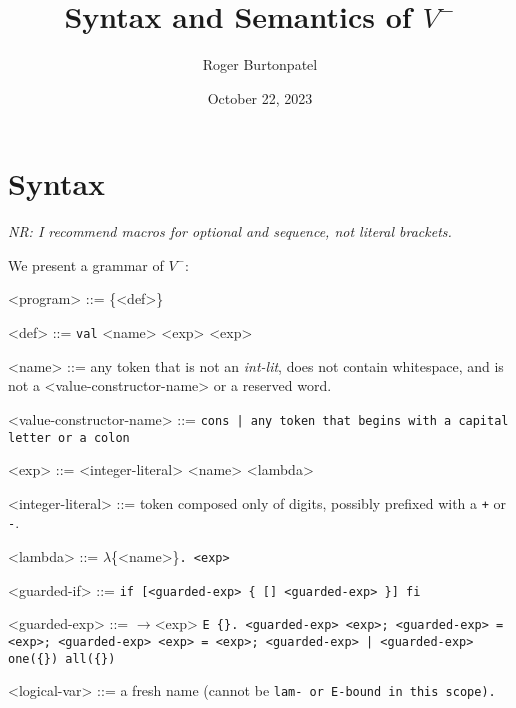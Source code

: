 \documentclass[]{article}
\title{Syntax and Semantics of $V^{-}$}
\author{Roger Burtonpatel}
\date{October 22, 2023}
\newcommand\nr[1]{\leavevmode\emph{NR: #1}}
\begin{document}
\maketitle

\section{Syntax}

\nr{I recommend macros for optional and sequence, not literal brackets.}

We present a grammar of $V^{-}$: 

\bigskip



\begin{grammar}
    <program> ::= \{<def>\}
    
    <def> ::= \texttt{val} <name> <exp>
        \alt <exp>
    
    <name> ::= any token that is not an \textit{int-lit}, does not contain 
    whitespace,
    and is not a <value-constructor-name> or a reserved word.

    <value-constructor-name> ::= \tt{cons} | any token that begins
    with a capital letter or a colon

    <exp> ::= <integer-literal>
        \alt <name>
        \alt <lambda>

    <integer-literal> ::= token composed only of digits, possibly prefixed with a \texttt{+} or \texttt{-}.

    <lambda> ::= $\lambda$\{<name>\}\tt{.} <exp>

    <guarded-if> ::= \tt{if}  [<guarded-exp> \{ [] <guarded-exp> \}] \tt{fi}


    <guarded-exp> ::= $\boldsymbol{\rightarrow}$<exp>
    \alt  \tt{E} \{<logical-var>\}\tt{.} <guarded-exp>
    \alt  <exp>\tt{;} <guarded-exp>
     \tt{=} <exp>\tt{;} <guarded-exp>
    \alt   <exp> \tt{=} <exp>\tt{;} <guarded-exp>
     | <guarded-exp> 
    \alt   \tt{one}(\{<guarded-exp>\})
    \alt   \tt{all}(\{<guarded-exp>\})

    <logical-var> ::= a fresh name (cannot be \tt{lam}- or \tt{E}-bound in
    this scope).

\end{grammar}
\end{document}
